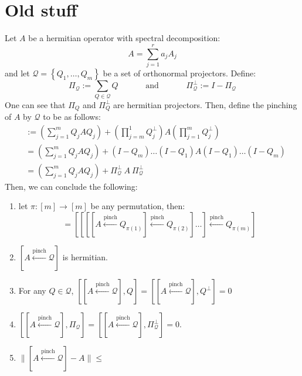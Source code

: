
\section{Old stuff}
\begin{lemma}

Let $A$ be a hermitian operator with spectral decomposition:
\begin{equation}
    A = \sum\limits_{j = 1}^r a_j A_j
\end{equation}
and let $\mathcal{Q} = \left\{Q_1, \dots, Q_m\right\}$ be a set of orthonormal projectors.
Define:
\begin{equation}
    \Pi_{\mathcal{Q}} := \sum\limits_{Q \in \mathcal{Q}} Q \quad\quad\quad \text{ and } \quad\quad\quad \Pi_{\mathcal{Q}}^\bot := I - \Pi_{\mathcal{Q}}
\end{equation}
One can see that $\Pi_Q$ and $\Pi_Q^\bot$ are hermitian projectors. Then, define the pinching of $A$ by $\mathcal{Q}$ to be as follows:
\begin{align*}
    [A \overset{\text{pinch}}{\gets} \mathcal{Q}] &:= \left(\sum\limits_{j = 1}^m Q_j AQ_j\right) + \left(\prod\limits_{j = m}^1 Q_j^\bot\right) A  \left(\prod\limits_{j = 1}^m Q_j^\bot\right)\\
    &= \left(\sum\limits_{j = 1}^m Q_j AQ_j\right) + (I - Q_m) \dots (I-Q_1) A (I - Q_1) \dots (I - Q_m)\\
    &= \left(\sum\limits_{j = 1}^m Q_j AQ_j\right) + \Pi_{\mathcal{Q}}^\bot \ A\ \Pi_{\mathcal{Q}}^\bot
\end{align*}
Then, we can conclude the following:
\begin{enumerate}
    \item let $\pi: [m] \to[m]$ be any permutation, then:
    \begin{equation}
        [A \overset{\text{pinch}}{\gets} \mathcal{Q}] = \left[\left[\left[[A \overset{\text{pinch}}{\gets} Q_{\pi(1)}] \overset{\text{pinch}}{\gets} Q_{\pi(2)}\right]\dots\right] \overset{\text{pinch}}{\gets} Q_{\pi(m)}\right]
    \end{equation}
    \item $[A \overset{\text{pinch}}{\gets} \mathcal{Q}]$ is hermitian.
    \item For any $Q \in \mathcal{Q}$, $\left[[A \overset{\text{pinch}}{\gets} \mathcal{Q}],Q\right] = \left[[A \overset{\text{pinch}}{\gets} \mathcal{Q}],Q^\bot\right] = 0$
    \item $\left[[A \overset{\text{pinch}}{\gets} \mathcal{Q}],\Pi_{\mathcal{Q}}\right] = \left[[A \overset{\text{pinch}}{\gets} \mathcal{Q}],\Pi_{\mathcal{Q}}^\bot\right] = 0$.
    \item $\|[A \overset{\text{pinch}}{\gets} \mathcal{Q}] - A\| \leq $
\end{enumerate}
    
\end{lemma}

